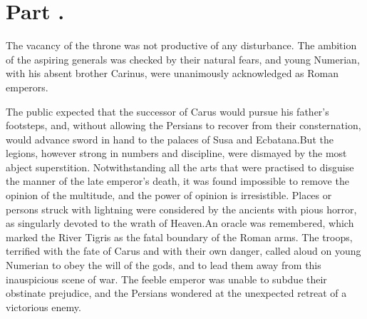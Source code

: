 \section{Part \thesection.}
\thispagestyle{simple}

The vacancy of the throne was not productive of any disturbance.
The ambition of the aspiring generals was checked by their
natural fears, and young Numerian, with his absent brother
Carinus, were unanimously acknowledged as Roman emperors.

The public expected that the successor of Carus would pursue his
father’s footsteps, and, without allowing the Persians to recover
from their consternation, would advance sword in hand to the
palaces of Susa and Ecbatana.\footnotemark[77] But the legions, however strong
in numbers and discipline, were dismayed by the most abject
superstition. Notwithstanding all the arts that were practised to
disguise the manner of the late emperor’s death, it was found
impossible to remove the opinion of the multitude, and the power
of opinion is irresistible. Places or persons struck with
lightning were considered by the ancients with pious horror, as
singularly devoted to the wrath of Heaven.\footnotemark[78] An oracle was
remembered, which marked the River Tigris as the fatal boundary
of the Roman arms. The troops, terrified with the fate of Carus
and with their own danger, called aloud on young Numerian to obey
the will of the gods, and to lead them away from this
inauspicious scene of war. The feeble emperor was unable to
subdue their obstinate prejudice, and the Persians wondered at
the unexpected retreat of a victorious enemy.\footnotemark[79]




